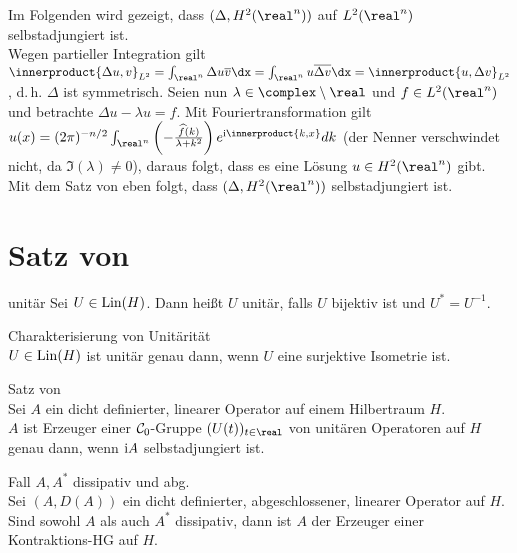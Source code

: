 \linie

\begin{Bsp}
    Im Folgenden wird gezeigt, dass $(\Delta, H^2(\real^n))$ auf $L^2(\real^n)$
    selbstadjungiert ist.\\
    Wegen partieller Integration gilt
    $\innerproduct{\Delta u, v}_{L^2} = \int_{\real^n} \Delta u \overline{v} \dx
    = \int_{\real^n} u \overline{\Delta v} \dx = \innerproduct{u, \Delta v}_{L^2}$,
    d.\,h. $\Delta$ ist symmetrisch.
    Seien nun $\lambda \in \complex \setminus \real$ und $f \in L^2(\real^n)$ und
    betrachte $\Delta u - \lambda u = f$.
    Mit Fouriertransformation gilt
    $u(x) = (2\pi)^{-n/2} \int_{\real^n}
    \left(-\frac{\widehat{f}(k)}{\lambda + k^2}\right) e^{\iu\innerproduct{k, x}} dk$
    (der Nenner verschwindet nicht, da $\Im(\lambda) \not= 0$),
    daraus folgt, dass es eine Lösung $u \in H^2(\real^n)$ gibt.
    Mit dem Satz von eben folgt, dass $(\Delta, H^2(\real^n))$ selbstadjungiert ist.
\end{Bsp}

\pagebreak

\section{%
    Satz von %
}

\begin{Def}{unitär}
    Sei $U \in \operatorname{Lin}(H)$.
    Dann heißt $U$ unitär, falls $U$ bijektiv ist und $U^\ast = U^{-1}$.
\end{Def}

\begin{Lemma}{Charakterisierung von Unitärität}\\
    $U \in \operatorname{Lin}(H)$ ist unitär genau dann,
    wenn $U$ eine surjektive Isometrie ist.
\end{Lemma}

\begin{Satz}{Satz von }\\
    Sei $A$ ein dicht definierter, linearer Operator auf einem Hilbertraum $H$.\\
    $A$ ist Erzeuger einer $\mathcal{C}_0$-Gruppe $(U(t))_{t \in \real}$ von unitären Operatoren
    auf $H$ genau dann, wenn $\mathrm{i} A$ selbstadjungiert ist.
\end{Satz}

\begin{Lemma}{Fall $A, A^\ast$ dissipativ und abg.}\\
    Sei $(A, D(A))$ ein dicht definierter, abgeschlossener, linearer Operator auf $H$.\\
    Sind sowohl $A$ als auch $A^\ast$ dissipativ, dann ist $A$ der Erzeuger einer
    Kontraktions-HG auf $H$.
\end{Lemma}

